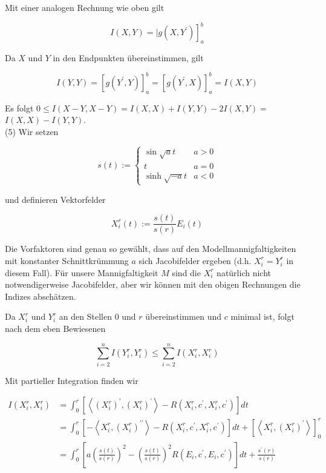 \documentclass[10pt, letterpaper]{article}
\begin{document}
Mit einer analogen Rechnung wie oben gilt

$$
\left.I(X, Y)=\mid g\left(X, Y^{\prime}\right)\right]_{a}^{b}
$$

Da $X$ und $Y$ in den Endpunkten übereinstimmen, gilt

$$
I(Y, Y)=\left[g\left(Y^{\prime}, Y\right)\right]_{a}^{b}=\left[g\left(Y^{\prime}, X\right)\right]_{a}^{b}=I(X, Y)
$$

Es folgt $0 \leq I(X-Y, X-Y)=I(X, X)+I(Y, Y)-2 I(X, Y)=$ $I(X, X)-I(Y, Y)$.\\
(5) Wir setzen

$$
s(t):= \begin{cases}\sin \sqrt{a} t & a>0 \\ t & a=0 \\ \sinh \sqrt{-a} t & a<0\end{cases}
$$

und definieren Vektorfelder

$$
X_{i}^{r}(t):=\frac{s(t)}{s(r)} E_{i}(t)
$$

Die Vorfaktoren sind genau so gewählt, dass auf den Modellmannigfaltigkeiten mit konstanter Schnittkrümmung $a$ sich Jacobifelder ergeben (d.h. $X_{i}^{r}=Y_{i}^{r}$ in diesem Fall). Für unsere Mannigfaltigkeit $M$ sind die $X_{i}^{r}$ natürlich nicht notwendigerweise Jacobifelder, aber wir können mit den obigen Rechnungen die Indizes abschätzen.

Da $X_{i}^{r}$ und $Y_{i}^{r}$ an den Stellen 0 und $r$ übereinstimmen und $c$ minimal ist, folgt nach dem eben Bewiesenen

$$
\sum_{i=2}^{n} I\left(Y_{i}^{r}, Y_{i}^{r}\right) \leq \sum_{i=2}^{n} I\left(X_{i}^{r}, X_{i}^{r}\right)
$$

Mit partieller Integration finden wir

$$
\begin{aligned}
I\left(X_{i}^{r}, X_{i}^{r}\right) & =\int_{0}^{r}\left[\left\langle\left(X_{i}^{r}\right)^{\prime},\left(X_{i}^{r}\right)^{\prime}\right\rangle-R\left(X_{i}^{r}, c^{\prime}, X_{i}^{r}, c^{\prime}\right)\right] d t \\
& =\int_{0}^{r}\left[-\left\langle X_{i}^{r},\left(X_{i}^{r}\right)^{\prime \prime}\right\rangle-R\left(X_{i}^{r}, c^{\prime}, X_{i}^{r}, c^{\prime}\right)\right] d t+\left[\left\langle X_{i}^{r},\left(X_{i}^{r}\right)^{\prime}\right\rangle\right]_{0}^{r} \\
& =\int_{0}^{r}\left[a\left(\frac{s(t)}{s(r)}\right)^{2}-\left(\frac{s(t)}{s(r)}\right)^{2} R\left(E_{i}, c^{\prime}, E_{i}, c^{\prime}\right)\right] d t+\frac{s^{\prime}(r)}{s(r)}
\end{aligned}
$$
\end{document}
